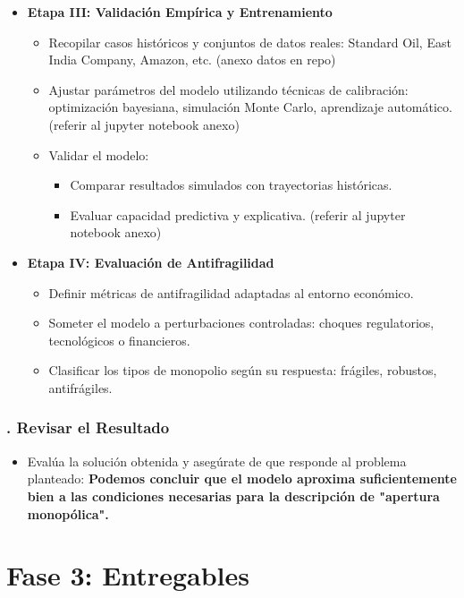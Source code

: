 \documentclass[a4paper,12pt]{article}
\begin{document}
\begin{itemize}
\item \textbf{Etapa III: Validación Empírica y Entrenamiento} 
	\begin{itemize}
    \item Recopilar casos históricos y conjuntos de datos reales: Standard Oil, East India Company, Amazon, etc. (anexo datos en repo)
    \item Ajustar parámetros del modelo utilizando técnicas de calibración: optimización bayesiana, simulación Monte Carlo, aprendizaje automático. (referir al jupyter notebook anexo)
    \item Validar el modelo:
    	\begin{itemize}
        \item Comparar resultados simulados con trayectorias históricas.
        \item Evaluar capacidad predictiva y explicativa.
        (referir al jupyter notebook anexo)
    	\end{itemize}
	\end{itemize}
	
\item \textbf{Etapa IV: Evaluación de Antifragilidad} 
	\begin{itemize}
    \item Definir métricas de antifragilidad adaptadas al entorno económico.
    \item Someter el modelo a perturbaciones controladas: choques regulatorios, tecnológicos o financieros.
    \item Clasificar los tipos de monopolio según su respuesta: frágiles, robustos, antifrágiles.
	\end{itemize}   
\end{itemize}



\subsubsection*{. Revisar el Resultado}

\begin{itemize}
    \item Evalúa la solución obtenida y asegúrate de que responde al problema planteado: 
\textbf{Podemos concluir que el modelo aproxima suficientemente bien a las condiciones necesarias para la descripción de "apertura monopólica".} 
\end{itemize}

\section*{Fase 3: Entregables}
\end{document}
